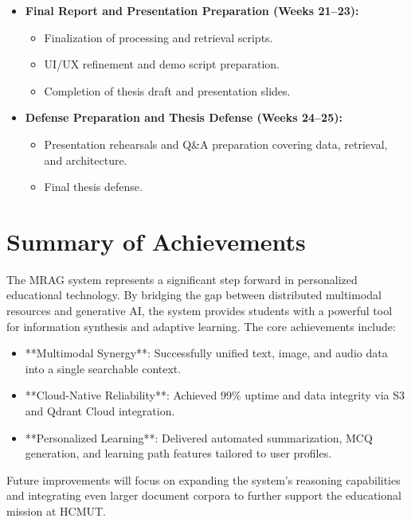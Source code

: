 \begin{itemize}
    \item \textbf{Final Report and Presentation Preparation (Weeks 21--23):}
    \begin{itemize}
        \item Finalization of processing and retrieval scripts.
        \item UI/UX refinement and demo script preparation.
        \item Completion of thesis draft and presentation slides.
    \end{itemize}

    \item \textbf{Defense Preparation and Thesis Defense (Weeks 24--25):}
    \begin{itemize}
        \item Presentation rehearsals and Q\&A preparation covering data, retrieval, and architecture.
        \item Final thesis defense.
    \end{itemize}
\end{itemize}

\section{Summary of Achievements}

The MRAG system represents a significant step forward in personalized educational technology. By bridging the gap between distributed multimodal resources and generative AI, the system provides students with a powerful tool for information synthesis and adaptive learning. The core achievements include:

\begin{itemize}
    \item **Multimodal Synergy**: Successfully unified text, image, and audio data into a single searchable context.
    \item **Cloud-Native Reliability**: Achieved 99\% uptime and data integrity via S3 and Qdrant Cloud integration.
    \item **Personalized Learning**: Delivered automated summarization, MCQ generation, and learning path features tailored to user profiles.
\end{itemize}

Future improvements will focus on expanding the system's reasoning capabilities and integrating even larger document corpora to further support the educational mission at HCMUT.

\newpage